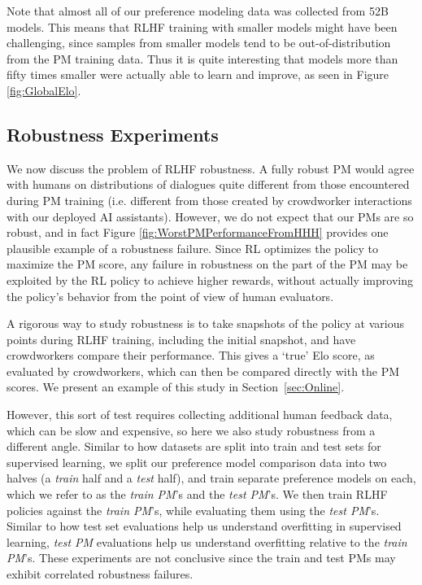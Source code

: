 Note that almost all of our preference modeling data was collected from 52B models.  This means that RLHF training with smaller models might have been challenging, since samples from smaller models tend to be out-of-distribution from the PM training data.  Thus it is quite interesting that models more than fifty times smaller were actually able to learn and improve, as seen in Figure \ref{fig:GlobalElo}. 

\subsection{Robustness Experiments}
\label{sec:RLHFRobustness}

We now discuss the problem of RLHF  robustness. A fully robust PM would agree with humans on distributions of dialogues quite different from those encountered during PM training (i.e. different from those created by crowdworker interactions with our deployed AI assistants).  However, we do not expect that our PMs are so robust, and in fact Figure \ref{fig:WorstPMPerformanceFromHHH} provides one plausible example of a robustness failure.  Since RL optimizes the policy to maximize the PM score, any failure in robustness on the part of the PM may be exploited by the RL policy to achieve higher rewards, without actually improving the policy's behavior from the point of view of human evaluators. 

A rigorous way to study robustness is to take snapshots of the policy at various points during RLHF training, including the initial snapshot, and have crowdworkers compare their performance.  This  gives a `true' Elo score, as evaluated by crowdworkers, which can then be compared directly with the PM scores.  We present an example of this study in Section~\ref{sec:Online}.

However, this sort of test requires collecting additional human feedback data, which can be slow and expensive, so here we also study robustness from a different angle. Similar to how datasets are split into train and test sets for supervised learning, we split our preference model comparison data into two halves (a {\it train} half and a {\it test} half), and train separate  preference models on each, which we refer to as the {\it train PM}'s and the {\it test PM}'s. We then train RLHF policies against the {\it train PM}'s, while evaluating them using the {\it test PM}'s. Similar to how test set evaluations help us understand overfitting in supervised learning, {\it test PM} evaluations help us understand overfitting relative to the {\it train PM}'s.  These experiments are not conclusive since the train and test PMs may exhibit correlated robustness failures.

